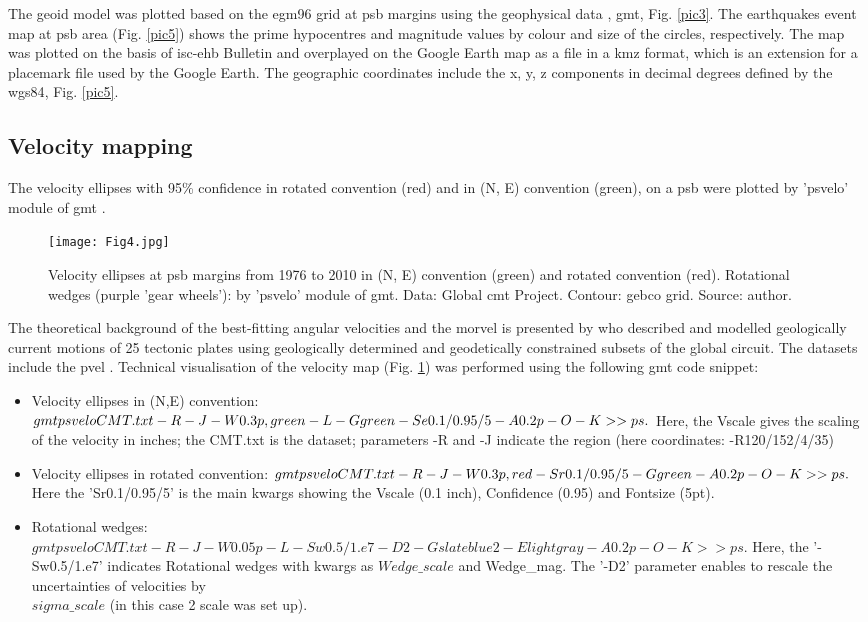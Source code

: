\documentclass{rrparticle}
\begin{document}
The geoid model was plotted based on the \ac{egm96} grid at \ac{psb} margins using the geophysical data \cite{Pavlis}, \ac{gmt}, Fig. \ref{pic3}. The earthquakes event map at \ac{psb} area (Fig. \ref{pic5}) shows the prime hypocentres and magnitude values by colour and size of the circles, respectively. The map was plotted on the basis of \ac{isc}-\ac{ehb} Bulletin and overplayed on the Google Earth map as a file in a \ac{kmz} format, which is an extension for a placemark file used by the Google Earth. The geographic coordinates include the x, y, z components in decimal degrees defined by the \ac{wgs84}, Fig. \ref{pic5}.
	
\subsection{Velocity mapping}	
The velocity ellipses with 95\% confidence in rotated convention (red) and in (N, E) convention (green), on a \ac{psb} were plotted by 'psvelo' module of \ac{gmt} \cite{Wessel}. 
	
\begin{figure}[H]
\centering
\texttt{[image: Fig4.jpg]}
\caption{Velocity ellipses at \ac{psb} margins from 1976 to 2010 in (N, E) convention (green) and rotated convention (red).  Rotational wedges (purple 'gear wheels'): by 'psvelo' module of \ac{gmt}. Data: Global \ac{cmt} Project. Contour: \ac{gebco} grid. Source: author.}
\label{pic4}
\end{figure}

The theoretical background of the best-fitting angular velocities and the \ac{morvel} is presented by \cite{DeMets2010} who described and modelled geologically current motions of 25 tectonic plates using geologically determined and geodetically constrained subsets of the global circuit. The datasets include the \ac{pvel} \cite{Sella}. Technical visualisation of the velocity map (Fig. \ref{pic4}) was performed using the following \ac{gmt} code snippet: 

\begin{itemize}\itemsep -0.5em 
  \item Velocity ellipses in (N,E) convention: $gmt psvelo CMT.txt -R -J \\-W0.3p,green -L -Ggreen -Se0.1/0.95/5 -A0.2p -O -K >> ps.$ Here, the Vscale gives the scaling of the velocity in inches; the CMT.txt is the dataset; parameters -R and -J indicate the region (here coordinates: -R120/152/4/35)
   \item Velocity ellipses in rotated convention: $gmt psvelo CMT.txt -R -J \\-W0.3p,red -Sr0.1/0.95/5 -Ggreen -A0.2p -O -K >> ps.$ Here the 'Sr0.1/0.95/5' is the main kwargs showing the Vscale (0.1 inch), Confidence (0.95) and Fontsize (5pt).
   \item Rotational wedges: $gmt psvelo CMT.txt -R -J -W0.05p -L -Sw0.5/1.e7 -D2 -Gslateblue2 -Elightgray -A0.2p -O -K >> ps.$ Here, the '-Sw0.5/1.e7' indicates Rotational wedges with kwargs as $Wedge\_scale$ and Wedge\_mag. The '-D2' parameter enables to rescale the uncertainties of velocities by \\$sigma\_scale$ (in this case 2 scale was set up). 
 \end{itemize}
\end{document}
